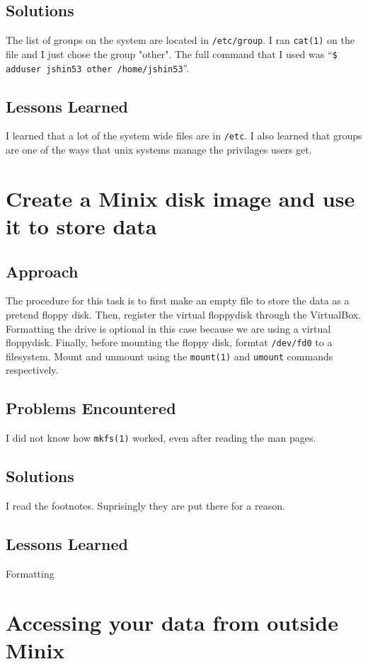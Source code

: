 \documentclass[11pt]{article}
\begin{document}
\subsection{Solutions}
The list of groups on the system are located in {\tt /etc/group}. I ran {\tt cat(1)} on the file and I just chose the group "other". The full command that I used was ``{\tt \$ adduser jshin53 other /home/jshin53}''.

\subsection{Lessons Learned}
I learned that a lot of the system wide files are in {\tt /etc}. I also learned that groups are one of the ways that unix systems manage the privilages users get.

\section{Create a {\sc Minix} disk image and use it to store data}
\subsection{Approach}
The procedure for this task is to first make an empty file to store the data as a pretend floppy disk. Then, register the virtual floppydisk through the {\sc VirtualBox}. Formatting the drive is optional in this case because we are using a virtual floppydisk. Finally, before mounting the floppy disk, formtat {\tt /dev/fd0} to a filesystem. Mount and unmount using the {\tt mount(1)} and {\tt umount} commands respectively.

\subsection{Problems Encountered}
I did not know how {\tt mkfs(1)} worked, even after reading the man pages.

\subsection{Solutions}
I read the footnotes. Suprisingly they are put there for a reason.

\subsection{Lessons Learned}
Formatting

\section{Accessing your data from outside {\sc Minix}}
\end{document}
